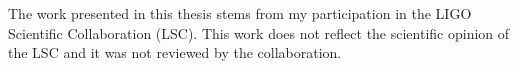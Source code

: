 
The work presented in this thesis stems from my participation in the
LIGO Scientific Collaboration (LSC).  This
work does not reflect the scientific opinion of the LSC and it was not
reviewed by the collaboration.
